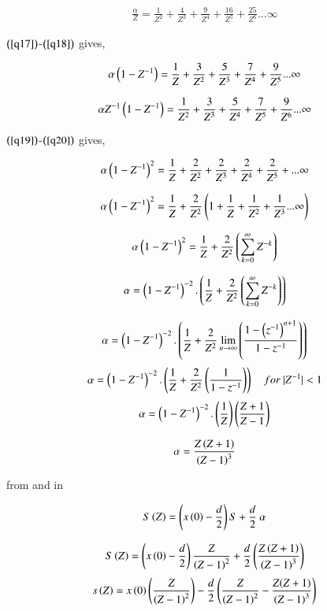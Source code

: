 \documentclass[beamer]{IEEEtran}
\theoremstyle{remark}
\begin{document}
\begin{align}
\label{q19}
    \frac{\alpha}{Z}=\frac{1}{Z^2}+\frac{4}{Z^3}+\frac{9}{Z^4}+\frac{16}{Z^5}+\frac{25}{Z^6}...\infty
\end{align}

$\left(\ref{q17}\right)$-$\left(\ref{q18}\right)$ gives,

\begin{align}
\label{q20}
   \alpha\left(1-Z^{-1}\right)=\frac{1}{Z}+\frac{3}{Z^2}+\frac{5}{Z^3}+\frac{7}{Z^4}+\frac{9}{Z^5}...\infty 
\end{align}

\begin{align}
\label{q21}
   \alpha Z^{-1}\left(1-Z^{-1}\right)=\frac{1}{Z^2}+\frac{3}{Z^3}+\frac{5}{Z^4}+\frac{7}{Z^5}+\frac{9}{Z^6}...\infty 
\end{align}

$\left(\ref{q19}\right)$-$\left(\ref{q20}\right)$ gives,

$$\alpha\left(1-Z^{-1}\right)^2=\frac{1}{Z}+\frac{2}{Z^2}+\frac{2}{Z^3}+\frac{2}{Z^4}+\frac{2}{Z^5}+...\infty$$

$$\alpha\left(1-Z^{-1}\right)^2=\frac{1}{Z}+\frac{2}{Z^2}\left(1+\frac{1}{Z}+\frac{1}{Z^2}+\frac{1}{Z^3}...\infty\right)$$

$$\alpha\left(1-Z^{-1}\right)^2=\frac{1}{Z}+\frac{2}{Z^2}\left(\sum_{k=0}^{\infty}Z^{-k}\right)$$

$$
\alpha=\left(1-Z^{-1}\right)^{-2}.\left(\frac{1}{Z}+\frac{2}{Z^2}\left(\sum_{k=0}^{\infty}Z^{-k}\right)\right)
$$

$$
\alpha=\left(1-Z^{-1}\right)^{-2}.\left(\frac{1}{Z}+\frac{2}{Z^2}\lim_{n\to\infty}\left(\frac{1-\left(z^{-1}\right)^{n+1}}{1-z^{-1}}\right)\right)
$$
$$
\alpha=\left(1-Z^{-1}\right)^{-2}.\left(\frac{1}{Z}+\frac{2}{Z^2}\left(\frac{1}{1-z^{-1}}\right)\right)\quad for\ |Z^{-1}|<1
$$
$$\alpha=\left(1-Z^{-1}\right)^{-2}.\left(\frac{1}{Z}\right)\left(\frac{Z+1}{Z-1}\right)
$$

\begin{align}
\label{q22}
\alpha=\frac{Z\left(Z+1\right)}{\left(Z-1\right)^3}
\end{align}

from \brak{\ref{q16}} and \brak{\ref{q22}} in \brak{\ref{q17}}

$$
S\left(Z\right)=\left(x\left(0\right)-\frac{d}{2}\right) S+\frac{d}{2}\ \alpha
$$

$$
S\left(Z\right)=\left(x\left(0\right)-\frac{d}{2}\right)\frac{Z}{\left(Z-1\right)^2}+\frac{d}{2}\left(\frac{Z\left(Z+1\right)}{\left(Z-1\right)^3}\right)
$$
$$s\left(Z\right)=x\left(0\right)\left(\frac{Z}{\left(Z-1\right)^2}\right)-\frac{d}{2}\left(\frac{Z}{\left(Z-1\right)^2}-\frac{Z(Z+1)}{\left(Z-1\right)^3}\right)$$
\end{document}
